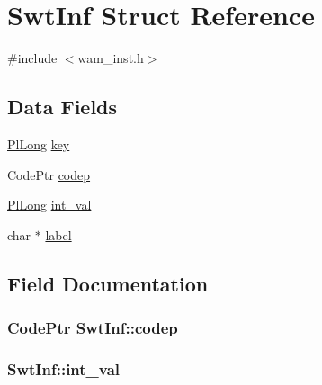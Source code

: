 \hypertarget{structSwtInf}{}\section{Swt\+Inf Struct Reference}
\label{structSwtInf}


{\ttfamily \#include $<$wam\+\_\+inst.\+h$>$}

\subsection*{Data Fields}
\begin{DoxyCompactItemize}
\item 
\hyperlink{gprolog_8h_a4d005b136d7fb28537eb1815f7868b63}{Pl\+Long} \hyperlink{structSwtInf_ad115955219677407a1cf8cdadc8ab19f}{key}
\item 
Code\+Ptr \hyperlink{structSwtInf_a6d3bad3eb0abb1b73b7776d5153c34fd}{codep}
\item 
\hyperlink{gprolog_8h_a4d005b136d7fb28537eb1815f7868b63}{Pl\+Long} \hyperlink{structSwtInf_a31e087797a5ae675b9c0a80344891bbc}{int\+\_\+val}
\item 
char $\ast$ \hyperlink{structSwtInf_aca3187b48d4bc13a963b097f9e228266}{label}
\end{DoxyCompactItemize}


\subsection{Field Documentation}
\subsubsection[{\texorpdfstring{codep}{codep}}]{\setlength{\rightskip}{0pt plus 5cm}Code\+Ptr Swt\+Inf\+::codep}\hypertarget{structSwtInf_a6d3bad3eb0abb1b73b7776d5153c34fd}{}\label{structSwtInf_a6d3bad3eb0abb1b73b7776d5153c34fd}
\subsubsection[{\texorpdfstring{int\+\_\+val}{int_val}}]{ Swt\+Inf\+::int\+\_\+val}\hypertarget{structSwtInf_a31e087797a5ae675b9c0a80344891bbc}{}\label{structSwtInf_a31e087797a5ae675b9c0a80344891bbc}
